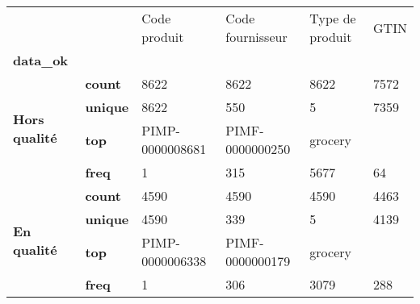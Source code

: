 \begin{tabularx}{\linewidth}{lXXXXX}
\toprule
           &      &     Code produit & Code fournisseur & Type de produit &  GTIN \\
\textbf{data\_ok} & {} &                  &                  &                 &       \\
\midrule
\multirow{4}{*}{\textbf{Hors qualité}} & \textbf{count} &             8622 &             8622 &            8622 &  7572 \\
           & \textbf{unique} &             8622 &              550 &               5 &  7359 \\
           & \textbf{top} &  PIMP-0000008681 &  PIMF-0000000250 &         grocery &       \\
           & \textbf{freq} &                1 &              315 &            5677 &    64 \\
\cline{1-6}
\multirow{4}{*}{\textbf{En qualité}} & \textbf{count} &             4590 &             4590 &            4590 &  4463 \\
           & \textbf{unique} &             4590 &              339 &               5 &  4139 \\
           & \textbf{top} &  PIMP-0000006338 &  PIMF-0000000179 &         grocery &       \\
           & \textbf{freq} &                1 &              306 &            3079 &   288 \\
\bottomrule
\end{tabularx}
